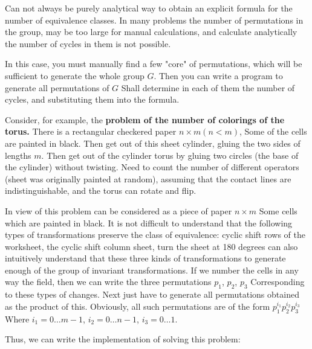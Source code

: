 Can not always be purely analytical way to obtain an explicit formula for the number of equivalence classes. In many problems the number of permutations in the group, may be too large for manual calculations, and calculate analytically the number of cycles in them is not possible.

In this case, you must manually find a few "core" of permutations, which will be sufficient to generate the whole group $G$. Then you can write a program to generate all permutations of $G$ Shall determine in each of them the number of cycles, and substituting them into the formula.

Consider, for example, the \textbf{problem of the number of colorings of the torus.} There is a rectangular checkered paper $n \times m$$(n <m)$, Some of the cells are painted in black. Then get out of this sheet cylinder, gluing the two sides of lengths $m$. Then get out of the cylinder torus by gluing two circles (the base of the cylinder) without twisting. Need to count the number of different operators (sheet was originally painted at random), assuming that the contact lines are indistinguishable, and the torus can rotate and flip.

In view of this problem can be considered as a piece of paper $n \times m$ Some cells which are painted in black. It is not difficult to understand that the following types of transformations preserve the class of equivalence: cyclic shift rows of the worksheet, the cyclic shift column sheet, turn the sheet at 180 degrees can also intuitively understand that these three kinds of transformations to generate enough of the group of invariant transformations. If we number the cells in any way the field, then we can write the three permutations $p_1$, $p_2$, $p_3$ Corresponding to these types of changes. Next just have to generate all permutations obtained as the product of this. Obviously, all such permutations are of the form $p_1 ^ {i_1} p_2 ^ {i_2} p_3 ^ {i_3}$ Where $i_1 = 0 \ldots m-1$, $i_2 = 0 \ldots n-1$, $i_3 = 0 \ldots 1$.

Thus, we can write the implementation of solving this problem:

